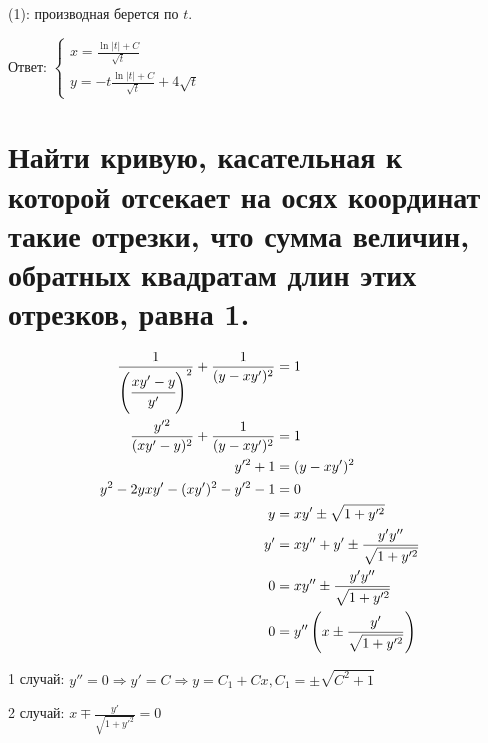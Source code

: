 (1): производная берется по $t$.

Ответ: $\begin{cases}
        x = \frac{\ln |t| + C}{\sqrt{t}} \\
        y = -t \frac{\ln |t| + C}{\sqrt{t}} + 4\sqrt{t}
    \end{cases}$

\section{Найти кривую, касательная к которой отсекает на осях координат такие отрезки, что сумма величин, обратных квадратам длин этих отрезков, равна 1.}

\begin{align*}
    \frac{1}{\left(\cfrac{xy'-y}{y'}\right)^2} + \frac{1}{(y-xy')^2} & = 1                                                \\
    \frac{y'^2}{(xy'-y)^2} + \frac{1}{(y-xy')^2}                     & = 1                                                \\
    y'^2 + 1                                                         & = (y-xy')^2                                        \\
    y^2 - 2yxy' - (xy')^2 - y'^2 - 1                                 & = 0                                                \\
    y                                                                & = xy' \pm \sqrt{1 + y'^2}                          \\
    y'                                                               & = xy'' + y' \pm \frac{y'y''}{\sqrt{1 + y'^2}}      \\
    0                                                                & = xy'' \pm \frac{y'y''}{\sqrt{1 + y'^2}}           \\
    0                                                                & = y''\left(x \pm \frac{y'}{\sqrt{1 + y'^2}}\right) \\
\end{align*}

1 случай: $y''=0 \Rightarrow y'=C \Rightarrow y = C_1 + Cx, C_1=\pm\sqrt{C^2+1}$

2 случай: $x \mp \frac{y'}{\sqrt{1 + y'^2}} = 0$


